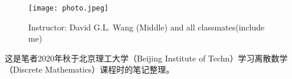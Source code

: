 \begin{figure*}[h]
	\centering
	\texttt{[image: photo.jpeg]}
	\caption{Instructor: David G.L. Wang (Middle) and all classmates(include me)\label{fig:photo}}
\end{figure*}
这是笔者2020年秋于北京理工大学（Beijing Institute of Techn）学习离散数学（Discrete Mathematics）课程时的笔记整理。